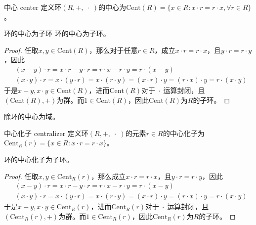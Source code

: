 \begin{definition}{中心 center}
	定义环$(R,+,\;\cdot\;)$的中心为$\mathrm{Cent}(R)=\{ x\in R:x\cdot r=r\cdot x,\forall r\in R \}$。
\end{definition}

\begin{proposition}{}{环的中心为子环}
	环的中心为子环。
\end{proposition}

\begin{proof}
	任取$x,y\in\mathrm{Cent}(R)$，那么对于任意$r\in R$，成立$x\cdot r=r\cdot x$，且$y\cdot r=r\cdot y$，因此
	\begin{align*}
		&(x-y)\cdot r=x\cdot r-y\cdot r=r\cdot x-r\cdot y=r\cdot (x-y)\\
		&(x\cdot y)\cdot r=x\cdot (y\cdot r)=x\cdot (r\cdot y)=(x\cdot r)\cdot y=(r\cdot x)\cdot y=r\cdot (x\cdot y)
	\end{align*}
	于是$x-y,x\cdot y\in\mathrm{Cent}(R)$，进而$\mathrm{Cent}(R)$对于$\;\cdot\;$运算封闭，且$(\mathrm{Cent}(R),+)$为群。而$1\in \mathrm{Cent}(R)$，因此$\mathrm{Cent}(R)$为$R$的子环。
\end{proof}

\begin{proposition}
	除环的中心为域。
\end{proposition}

\begin{definition}{中心化子 centralizer}
	定义环$(R,+,\;\cdot\;)$的元素$r\in R$的中心化子为$\mathrm{Cent}_R(r)=\{ x\in R:x\cdot r=r\cdot x \}$。
\end{definition}

\begin{proposition}
	环的中心化子为子环。
\end{proposition}

\begin{proof}
	任取$x,y\in\mathrm{Cent}_R(r)$，那么成立$x\cdot r=r\cdot x$，且$y\cdot r=r\cdot y$，因此
	\begin{align*}
		&(x-y)\cdot r=x\cdot r-y\cdot r=r\cdot x-r\cdot y=r\cdot (x-y)\\
		&(x\cdot y)\cdot r=x\cdot (y\cdot r)=x\cdot (r\cdot y)=(x\cdot r)\cdot y=(r\cdot x)\cdot y=r\cdot (x\cdot y)
	\end{align*}
	于是$x-y,x\cdot y\in\mathrm{Cent}_R(r)$，进而$\mathrm{Cent}_R(r)$对于$\;\cdot\;$运算封闭，且$(\mathrm{Cent}_R(r),+)$为群。而$1\in \mathrm{Cent}_R(r)$，因此$\mathrm{Cent}_R(r)$为$R$的子环。
\end{proof}

